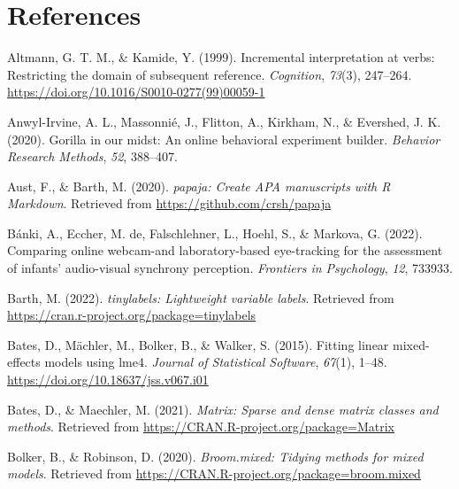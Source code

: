 \documentclass[
  man,floatsintext]{apa6}
\newlength{\cslhangindent}
\newenvironment{CSLReferences}[2] %
 {\begin{list}{}{%
  \setlength{\itemindent}{0pt}
  \setlength{\leftmargin}{0pt}
  \setlength{\parsep}{0pt}
  \ifodd #1
   \setlength{\leftmargin}{\cslhangindent}
   \setlength{\itemindent}{-1\cslhangindent}
  \fi
  \setlength{\itemsep}{#2\baselineskip}}}
 {\end{list}}
\begin{document}
\newpage

\section{References}\label{references}

\begingroup
\setlength{\parindent}{-0.5in}
\setlength{\leftskip}{0.5in}

\label{refs}
\begin{CSLReferences}{1}{0}
Altmann, G. T. M., \& Kamide, Y. (1999). Incremental interpretation at verbs: Restricting the domain of subsequent reference. \emph{Cognition}, \emph{73}(3), 247--264. \url{https://doi.org/10.1016/S0010-0277(99)00059-1}

Anwyl-Irvine, A. L., Massonnié, J., Flitton, A., Kirkham, N., \& Evershed, J. K. (2020). Gorilla in our midst: An online behavioral experiment builder. \emph{Behavior Research Methods}, \emph{52}, 388--407.

Aust, F., \& Barth, M. (2020). \emph{{papaja}: {Create} {APA} manuscripts with {R Markdown}}. Retrieved from \url{https://github.com/crsh/papaja}

Bánki, A., Eccher, M. de, Falschlehner, L., Hoehl, S., \& Markova, G. (2022). Comparing online webcam-and laboratory-based eye-tracking for the assessment of infants' audio-visual synchrony perception. \emph{Frontiers in Psychology}, \emph{12}, 733933.

Barth, M. (2022). \emph{{tinylabels}: Lightweight variable labels}. Retrieved from \url{https://cran.r-project.org/package=tinylabels}

Bates, D., Mächler, M., Bolker, B., \& Walker, S. (2015). Fitting linear mixed-effects models using {lme4}. \emph{Journal of Statistical Software}, \emph{67}(1), 1--48. \url{https://doi.org/10.18637/jss.v067.i01}

Bates, D., \& Maechler, M. (2021). \emph{Matrix: Sparse and dense matrix classes and methods}. Retrieved from \url{https://CRAN.R-project.org/package=Matrix}

Bolker, B., \& Robinson, D. (2020). \emph{Broom.mixed: Tidying methods for mixed models}. Retrieved from \url{https://CRAN.R-project.org/package=broom.mixed}


\end{CSLReferences}
\end{document}
